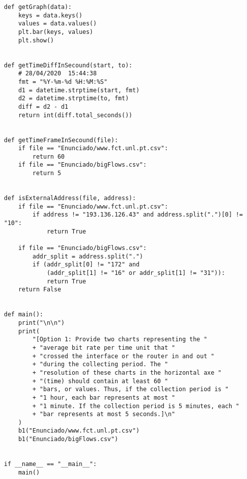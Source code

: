 \begin{lstlisting}
def getGraph(data):
    keys = data.keys()
    values = data.values()
    plt.bar(keys, values)
    plt.show()


def getTimeDiffInSecound(start, to):
    # 28/04/2020  15:44:38
    fmt = "%Y-%m-%d %H:%M:%S"
    d1 = datetime.strptime(start, fmt)
    d2 = datetime.strptime(to, fmt)
    diff = d2 - d1
    return int(diff.total_seconds())


def getTimeFrameInSecound(file):
    if file == "Enunciado/www.fct.unl.pt.csv":
        return 60
    if file == "Enunciado/bigFlows.csv":
        return 5


def isExternalAddress(file, address):
    if file == "Enunciado/www.fct.unl.pt.csv":
        if address != "193.136.126.43" and address.split(".")[0] != "10":
            return True

    if file == "Enunciado/bigFlows.csv":
        addr_split = address.split(".")
        if (addr_split[0] != "172" and 
            (addr_split[1] != "16" or addr_split[1] != "31")):
            return True
    return False


def main():
    print("\n\n")
    print(
        "[Option 1: Provide two charts representing the "
        + "average bit rate per time unit that "
        + "crossed the interface or the router in and out "
        + "during the collecting period. The "
        + "resolution of these charts in the horizontal axe "
        + "(time) should contain at least 60 "
        + "bars, or values. Thus, if the collection period is "
        + "1 hour, each bar represents at most "
        + "1 minute. If the collection period is 5 minutes, each "
        + "bar represents at most 5 seconds.]\n"
    )
    b1("Enunciado/www.fct.unl.pt.csv")
    b1("Enunciado/bigFlows.csv")


if __name__ == "__main__":
    main()

\end{lstlisting}

